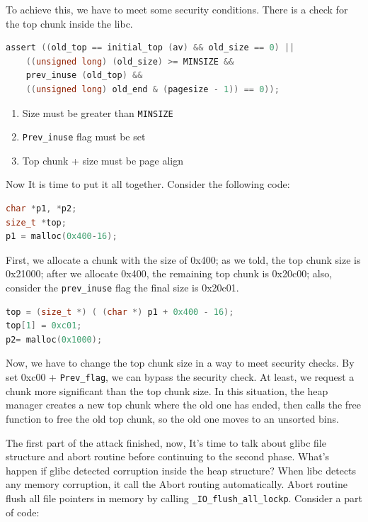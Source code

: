 \documentclass{masterthesis}
\newcommand*\libc{glibc}
\newcommand*\ub{unsorted bins}
\begin{document}
To achieve this, we have to meet some security conditions. There is a check for the top chunk inside the libc.
\begin{lstlisting}[language=c,frame=tlrb]
 assert ((old_top == initial_top (av) && old_size == 0) ||
	((unsigned long) (old_size) >= MINSIZE &&
	prev_inuse (old_top) &&
	((unsigned long) old_end & (pagesize - 1)) == 0));
\end{lstlisting}

\begin{enumerate}
	\item Size must be greater than \lstinline{MINSIZE}
	\item \lstinline{Prev_inuse} flag must be set
	\item Top chunk + size must be page align
\end{enumerate}

Now It is time to put it all together. Consider the following code:

\begin{lstlisting}[language=c,frame=tlrb]
char *p1, *p2;
size_t *top;
p1 = malloc(0x400-16);
 \end{lstlisting}

First, we allocate a chunk with the size of 0x400; as we told, the top chunk size is 0x21000; after we allocate 0x400, the remaining top chunk is 0x20c00; also, consider the \lstinline{prev_inuse} flag the final size is 0x20c01.

\begin{lstlisting}[language=c,frame=tlrb]
top = (size_t *) ( (char *) p1 + 0x400 - 16);
top[1] = 0xc01;
p2= malloc(0x1000);
\end{lstlisting}

Now, we have to change the top chunk size in a way to meet security checks. By set 0xc00 + \lstinline{Prev_flag}, we can bypass the security check. At least, we request a chunk more significant than the top chunk size. In this situation, the heap manager creates a new top chunk where the old one has ended, then calls the free function to free the old top chunk, so the old one moves to an \ub{}.

The first part of the attack finished, now, It's time to talk about \libc{} file structure and abort routine before continuing to the second phase. What's happen if \libc{} detected corruption inside the heap structure? When libc detects any memory corruption, it call the Abort routing automatically. Abort routine flush all file pointers in memory by calling \lstinline{_IO_flush_all_lockp}. Consider a part of code:
\end{document}
